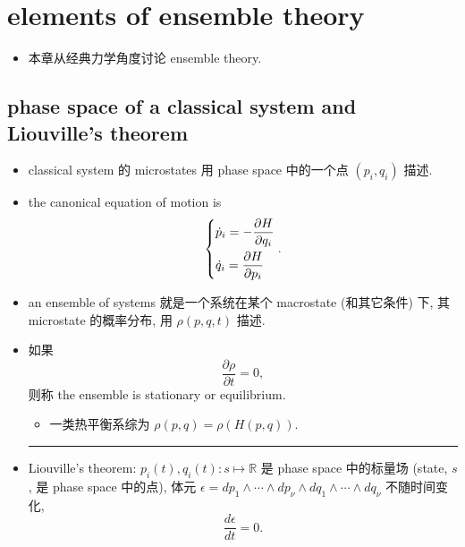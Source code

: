\chapter{elements of ensemble theory}
\begin{itemize}
	\item 本章从经典力学角度讨论 ensemble theory.
\end{itemize}

\section{phase space of a classical system and Liouville's theorem}
\begin{itemize}
	\item classical system 的 microstates 用 phase space 中的一个点 $(p_i, q_i)$ 描述.
	
	\item the canonical equation of motion is
	\begin{equation}
		\begin{dcases}
			\dot{p}_i = - \frac{\partial H}{\partial q_i} \\
			\dot{q}_i = \frac{\partial H}{\partial p_i}
		\end{dcases}.
	\end{equation}
	
	\item an ensemble of systems 就是一个系统在某个 macrostate (和其它条件) 下, 其 microstate 的概率分布, 用 $\rho(p, q, t)$ 描述.
	
	\item 如果
	\begin{equation}
		\frac{\partial \rho}{\partial t} = 0,
	\end{equation}
	则称 the ensemble is stationary or equilibrium.
	\begin{itemize}
		\item 一类热平衡系综为 $\rho(p, q) = \rho(H(p, q))$.
	\end{itemize}
	
	\noindent\rule[0.5ex]{\linewidth}{0.5pt} %
	
	\item Liouville's theorem: $p_i(t), q_i(t) : s \mapsto \mathbb{R}$ 是 phase space 中的标量场 (state, $s$, 是 phase space 中的点), 体元 $\epsilon = dp_1 \wedge \cdots \wedge dp_\nu \wedge dq_1 \wedge \cdots \wedge dq_\nu$ 不随时间变化,
	\begin{equation}
		\frac{d\epsilon}{dt} = 0.
	\end{equation}
	

\end{itemize}
